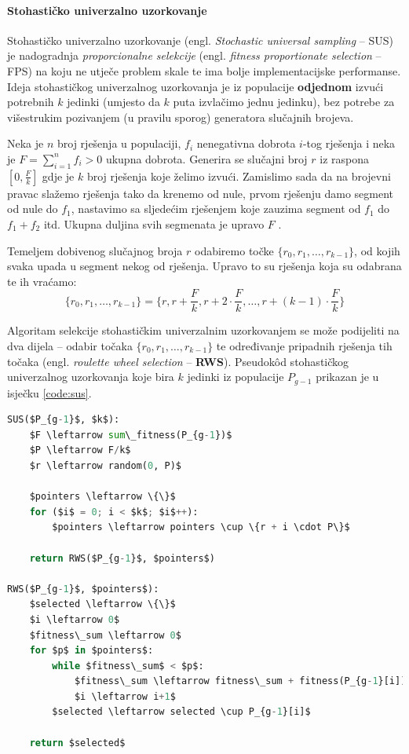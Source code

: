 \documentclass[times, utf8, zavrsni]{fer}
\begin{document}
\paragraph{Stohastičko univerzalno uzorkovanje} Stohastičko univerzalno uzorkovanje (engl. \textit{Stochastic universal sampling} -- SUS) je nadogradnja \textit{proporcionalne selekcije} (engl. \textit{fitness proportionate selection} -- FPS) na koju ne utječe problem skale te ima bolje implementacijske performanse. Ideja stohastičkog univerzalnog uzorkovanja je iz populacije \textbf{odjednom} izvući potrebnih $k$ jedinki (umjesto da $k$ puta izvlačimo jednu jedinku), bez potrebe za višestrukim pozivanjem (u pravilu sporog) generatora slučajnih brojeva. 

Neka je $n$ broj rješenja u populaciji, $f_i$ nenegativna dobrota $i$-tog rješenja i neka je $F = \sum_{i=1}^{n} f_i > 0$ ukupna dobrota. Generira se slučajni broj $r$ iz raspona $[0, \frac{F}{k}]$ gdje je $k$ broj rješenja koje želimo izvući. Zamislimo sada da na brojevni pravac slažemo rješenja tako da krenemo od nule, prvom rješenju damo segment od nule do $f_1$, nastavimo sa sljedećim rješenjem koje zauzima segment od $f_1$ do $f_1 + f_2$ itd. Ukupna duljina svih segmenata je upravo $F$ \citep{book:cupic_optjava}.

Temeljem dobivenog slučajnog broja $r$ odabiremo točke $\{ r_0, r_1, \dots, r_{k-1} \}$, od kojih svaka upada u segment nekog od rješenja. Upravo to su rješenja koja su odabrana te ih vraćamo:
$$
\{
	r_0,
	r_1,
	\dots,
	r_{k-1}
\}
=
\{
	r,
	r+ \frac{F}{k},
	r+2 \cdot \frac{F}{k},
	\dots,
	r+(k-1) \cdot \frac{F}{k}
\}
$$

Algoritam selekcije stohastičkim univerzalnim uzorkovanjem se može podijeliti na dva dijela -- odabir točaka $\{ r_0, r_1, \dots, r_{k-1} \}$ te određivanje pripadnih rješenja tih točaka (engl. \textit{roulette wheel selection} -- \textbf{RWS}). Pseudok\^{o}d stohastičkog univerzalnog uzorkovanja koje bira $k$ jedinki iz populacije $P_{g-1}$ prikazan je u isječku \ref{code:sus}.

\begin{lstlisting}[language=Python, caption=Stohastičko univerzalno uzorkovanje, label={code:sus}, mathescape]
SUS($P_{g-1}$, $k$):
	$F \leftarrow sum\_fitness(P_{g-1})$
	$P \leftarrow F/k$
	$r \leftarrow random(0, P)$

	$pointers \leftarrow \{\}$
	for ($i$ = 0; i < $k$; $i$++):
		$pointers \leftarrow pointers \cup \{r + i \cdot P\}$
	
	return RWS($P_{g-1}$, $pointers$)

RWS($P_{g-1}$, $pointers$):
	$selected \leftarrow \{\}$
	$i \leftarrow 0$
	$fitness\_sum \leftarrow 0$
	for $p$ in $pointers$:
		while $fitness\_sum$ < $p$:
			$fitness\_sum \leftarrow fitness\_sum + fitness(P_{g-1}[i])$
			$i \leftarrow i+1$
		$selected \leftarrow selected \cup P_{g-1}[i]$
	
	return $selected$
\end{lstlisting}
\end{document}
